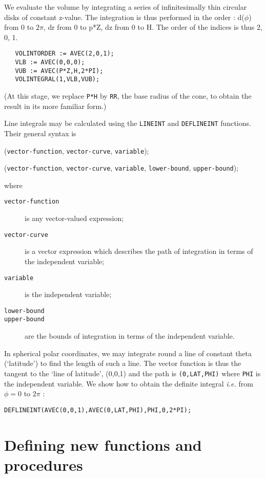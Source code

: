 We evaluate the volume by integrating a series of infinitesimally thin
circular disks of constant z-value. The integration is thus performed
in the order : d($\phi$) from 0 to $2\pi$, dr from 0 to p*Z, dz from 0 to H.
The order of the indices is thus 2, 0, 1.
\begin{verbatim}
   VOLINTORDER := AVEC(2,0,1);
   VLB := AVEC(0,0,0);
   VUB := AVEC(P*Z,H,2*PI);
   VOLINTEGRAL(1,VLB,VUB);
\end{verbatim}
(At this stage, we replace {\tt P*H} by {\tt RR}, the base radius of the cone,
to obtain the result in its more familiar form.)


Line integrals may be calculated using the {\tt LINEINT} and {\tt DEFLINEINT}
functions. Their general syntax is

({\tt vector-function}, {\tt vector-curve},
{\tt variable});

({\tt vector-function}, {\tt vector-curve},
{\tt variable}, {\tt lower-bound}, {\tt upper-bound});

\noindent where 
\begin{description}
\item[{\tt vector-function}] is any vector-valued expression;
\item[{\tt vector-curve}] is a vector expression which describes the path of
integration in terms of the independent variable;
\item[{\tt variable}] is the independent variable;
\item[{\tt lower-bound}]
\item[{\tt upper-bound}] are the bounds of integration in terms of the
independent variable.
\end{description}


In spherical polar coordinates, we may integrate round a line of
constant theta (`latitude') to find the length of such a line. The
vector function is thus the tangent to the `line of latitude', (0,0,1)
and the path is {\tt (0,LAT,PHI)} where {\tt PHI} is the independent
variable. We show how to obtain the definite integral {\em i.e.} from
$\phi=0$ to $2 \pi$ :
\begin{verbatim}
DEFLINEINT(AVEC(0,0,1),AVEC(0,LAT,PHI),PHI,0,2*PI);
\end{verbatim}

\section{Defining new functions and procedures}

